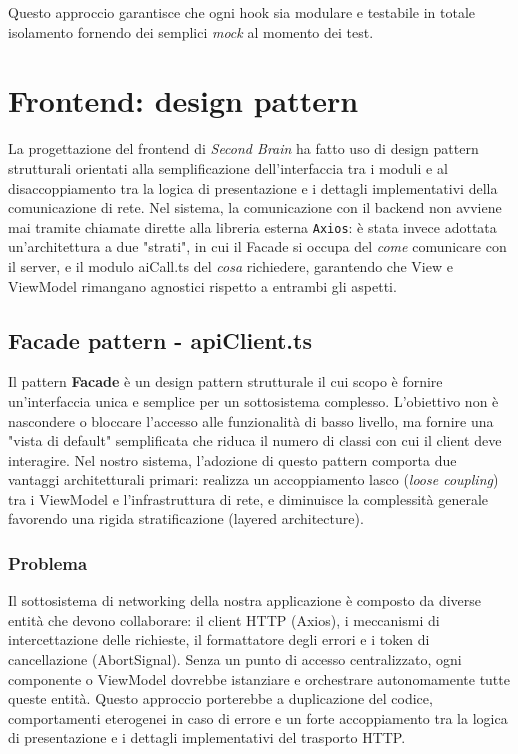 \documentclass[11pt,a4paper]{article}
\begin{document}
Questo approccio garantisce che ogni hook sia modulare e testabile in totale isolamento fornendo dei semplici \textit{mock} al momento dei test.


\newpage

\section{Frontend: design pattern}
La progettazione del frontend di \textit{Second Brain} ha fatto uso di design pattern strutturali 
orientati alla semplificazione dell'interfaccia tra i moduli e al disaccoppiamento tra la logica 
di presentazione e i dettagli implementativi della comunicazione di rete. Nel sistema, la 
comunicazione con il backend non avviene mai tramite chiamate dirette alla libreria esterna 
\texttt{Axios}: è stata invece adottata un'architettura a due "strati", 
in cui il Facade si occupa del \textit{come} comunicare con il server, e il modulo aiCall.ts del 
\textit{cosa} richiedere, garantendo che View e ViewModel rimangano agnostici rispetto a 
entrambi gli aspetti.

\subsection{Facade pattern - apiClient.ts}
Il pattern \textbf{Facade} è un design pattern strutturale il cui scopo è fornire un'interfaccia unica e semplice per un sottosistema complesso. L'obiettivo non è nascondere o bloccare l'accesso alle funzionalità di basso livello, ma fornire una "vista di default" semplificata che riduca il numero di classi con cui il client deve interagire. Nel nostro sistema, l'adozione di questo pattern comporta due vantaggi architetturali primari: realizza un accoppiamento lasco (\textit{loose coupling}) tra i ViewModel e l'infrastruttura di rete, e diminuisce la complessità generale favorendo una rigida stratificazione (layered architecture).

\subsubsection{Problema}
Il sottosistema di networking della nostra applicazione è composto da diverse entità che devono collaborare: il client HTTP (Axios), i meccanismi di intercettazione delle richieste, il formattatore degli errori e i token di cancellazione (AbortSignal). 
Senza un punto di accesso centralizzato, ogni componente o ViewModel dovrebbe istanziare e orchestrare autonomamente tutte queste entità. Questo approccio porterebbe a duplicazione del codice, comportamenti eterogenei in caso di errore e un forte accoppiamento tra la logica di presentazione e i dettagli implementativi del trasporto HTTP.
\end{document}
